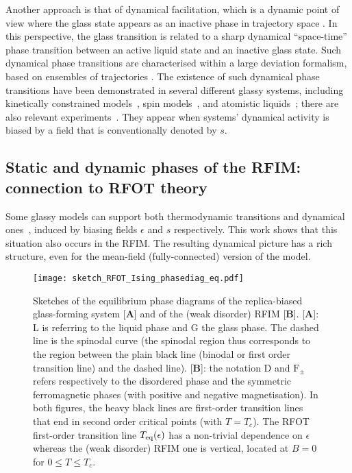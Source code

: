 \documentclass{iopart}
\begin{document}
Another approach is that of dynamical facilitation, 
which is a dynamic point of view where the glass state appears as an inactive phase in trajectory space \cite{Chandler2010}. In this perspective, the glass transition is related to a sharp dynamical ``space-time'' phase transition between an active liquid state and an inactive glass state.
Such dynamical phase transitions are characterised within a large deviation formalism, based on ensembles of trajectories \cite{garrahan2007dynamical, garrahan2009first, hedges2009dynamic}.
The existence of such dynamical phase transitions have been demonstrated in several different glassy systems, including kinetically constrained models~\cite{garrahan2007dynamical, garrahan2009first,Bodineau2012jsp,nemoto2014finite}, spin models~\cite{Jack2010rom, van2010second, jack2016phase, Turner2015}, and atomistic liquids~\cite{hedges2009dynamic,Malins2012-sens}; there are also relevant experiments~\cite{pinch17,Abou2018}.   They appear when systems' dynamical activity is biased by a field that is conventionally denoted by $s$.

\subsection{Static and dynamic phases of the RFIM: connection to RFOT theory}


Some glassy models can support both thermodynamic transitions and dynamical ones~\cite{Turner2015,jack2016phase}, induced by biasing fields $\epsilon$ and $s$ respectively.  This work shows that this situation also occurs in the RFIM.
The resulting dynamical picture has a rich structure, even for the mean-field (fully-connected) version of the model.  




\begin{figure}
  \centering
  \texttt{[image: sketch\_RFOT\_Ising\_phasediag\_eq.pdf]}
  \caption{Sketches of the equilibrium  phase diagrams of the replica-biased glass-forming system [\textbf{A}] and of the (weak disorder) RFIM [\textbf{B}]. [\textbf{A}]: L is referring to the liquid phase and G the glass phase. The dashed line is the spinodal curve (the spinodal region thus corresponds to the region between the plain black line (binodal or first order transition line) and the dashed line). [\textbf{B}]: the notation D and $\mathrm{F}_{\pm}$ refers respectively to the disordered phase and the symmetric ferromagnetic phases (with positive and negative magnetisation). 
 In both figures, the heavy black lines are first-order transition lines that end in second order critical points (with $T=T_{c}$).
  The RFOT first-order transition line $T_{\rm eq}(\epsilon)$ has a non-trivial dependence on $\epsilon$ whereas the (weak disorder) RFIM one is vertical, located at $B=0$ for $0 \leqslant T \leqslant T_{c}$.}
  \label{fig:0}
\end{figure}
\end{document}
